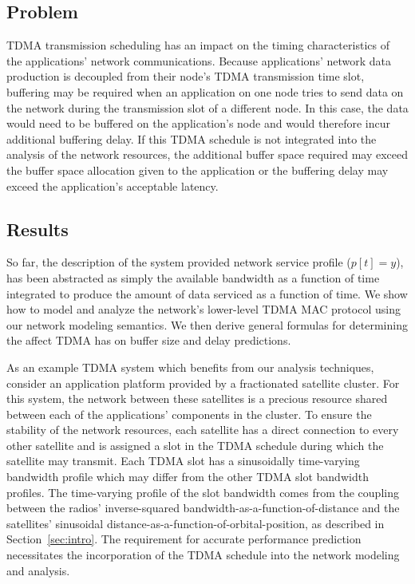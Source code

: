 \subsection{Problem}
TDMA transmission scheduling has an impact on the timing
characteristics of the applications' network communications.  Because
applications' network data production is decoupled from their node's
TDMA transmission time slot, buffering may be required when an
application on one node tries to send data on the network during the
transmission slot of a different node.  In this case, the data would
need to be buffered on the application's node and would therefore
incur additional buffering delay.  If this TDMA schedule is not
integrated into the analysis of the network resources, the additional
buffer space required may exceed the buffer space allocation given to
the application or the buffering delay may exceed the application's
acceptable latency.

\subsection{Results}

So far, the description of the system provided network service profile
($p[t]=y$), has been abstracted as simply the available
bandwidth as a function of time integrated to produce the amount of
data serviced as a function of time. We show how to model and analyze
the network's lower-level TDMA MAC protocol using our network modeling
semantics.  We then derive general formulas for determining the affect
TDMA has on buffer size and delay predictions.

As an example TDMA system which benefits from our analysis techniques,
consider an application platform provided by a fractionated satellite
cluster.  For this system, the network between these satellites is a
precious resource shared between each of the applications' components
in the cluster.  To ensure the stability of the network resources,
each satellite has a direct connection to every other satellite and is
assigned a slot in the TDMA schedule during which the satellite may
transmit.  Each TDMA slot has a sinusoidally time-varying bandwidth
profile which may differ from the other TDMA slot bandwidth profiles.
The time-varying profile of the slot bandwidth comes from the coupling
between the radios' inverse-squared
bandwidth-as-a-function-of-distance and the satellites' sinusoidal
distance-as-a-function-of-orbital-position, as described in
Section~\ref{sec:intro}. The requirement for accurate performance
prediction necessitates the incorporation of the TDMA schedule into
the network modeling and analysis.


